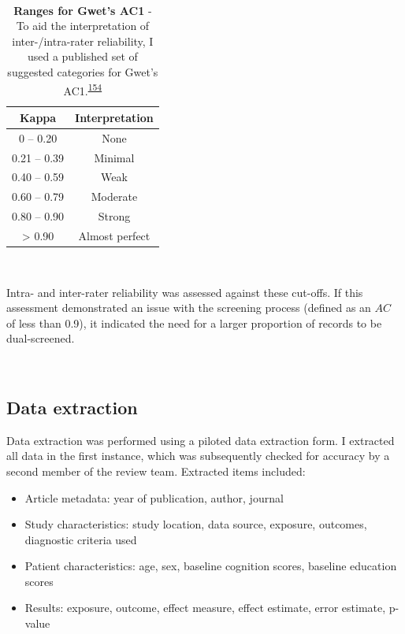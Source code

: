 \documentclass[a4paper, twoside]{templates/ociamthesis}
\providecommand{\tightlist}{%
  \setlength{\itemsep}{0pt}\setlength{\parskip}{0pt}}
\begin{document}
~





\begin{table}[H]

\caption[Ranges for Gwet's AC1]{\label{tab:gwet-table}\textbf{Ranges for Gwet's AC1} - To aid the interpretation of inter-/intra-rater reliability, I used a published set of suggested categories for Gwet's AC1.\textsuperscript{\protect\hyperlink{ref-mchugh2012}{154}}}
\centering
\begin{tabular}[t]{cc}
\toprule
\textbf{Kappa} & \textbf{Interpretation}\\
\midrule
0    – 0.20 & None\\
\midrule
0.21 – 0.39 & Minimal\\
\midrule
0.40 – 0.59 & Weak\\
\midrule
0.60 – 0.79 & Moderate\\
\midrule
0.80 – 0.90 & Strong\\
\midrule
\addlinespace
> 0.90 & Almost perfect\\
\bottomrule
\end{tabular}
\end{table}

~

Intra- and inter-rater reliability was assessed against these cut-offs. If this assessment demonstrated an issue with the screening process (defined as an \(AC\) of less than 0.9), it indicated the need for a larger proportion of records to be dual-screened.

~

\hypertarget{data-extraction}{%
\subsection{Data extraction}\label{data-extraction}}

Data extraction was performed using a piloted data extraction form. I extracted all data in the first instance, which was subsequently checked for accuracy by a second member of the review team. Extracted items included:

\begin{itemize}
\tightlist
\item
  Article metadata: year of publication, author, journal
\item
  Study characteristics: study location, data source, exposure, outcomes, diagnostic criteria used
\item
  Patient characteristics: age, sex, baseline cognition scores, baseline education scores
\item
  Results: exposure, outcome, effect measure, effect estimate, error estimate, p-value
\end{itemize}
\end{document}
